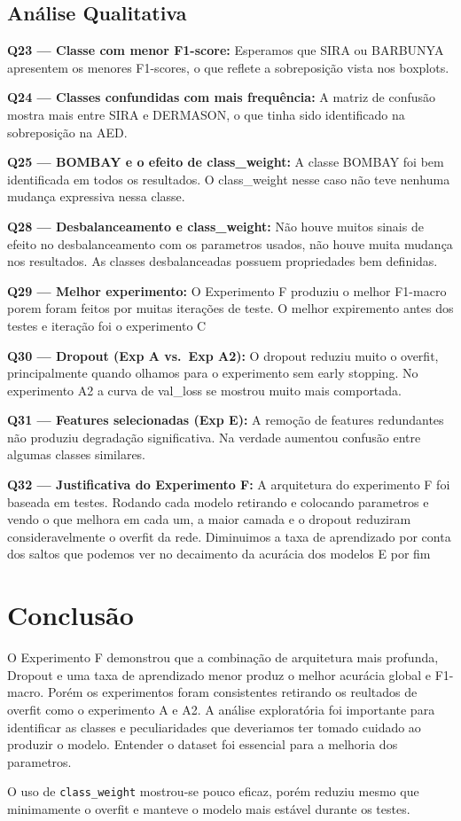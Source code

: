\documentclass[12pt,a4paper]{article}
\begin{document}
\subsection{Análise Qualitativa}

\textbf{Q23 — Classe com menor F1-score:}
Esperamos que SIRA ou BARBUNYA apresentem os menores F1-scores, o que reflete a sobreposição vista nos boxplots.


\textbf{Q24 — Classes confundidas com mais frequência:}
A matriz de confusão mostra mais entre SIRA e DERMASON,
o que tinha sido identificado na
sobreposição na AED.

\textbf{Q25 — BOMBAY e o efeito de class\_weight:}
A classe BOMBAY foi bem identificada em todos os resultados. O class\_weight nesse caso não teve nenhuma mudança expressiva nessa classe.

\textbf{Q28 — Desbalanceamento e class\_weight:}
Não houve muitos sinais de efeito no desbalanceamento com os parametros usados, não houve muita mudança nos resultados. As classes desbalanceadas possuem propriedades bem definidas.

\textbf{Q29 — Melhor experimento:}
O Experimento F produziu o melhor F1-macro porem foram feitos por muitas iterações de teste. O melhor expiremento antes dos testes e iteração foi o experimento C

\textbf{Q30 — Dropout (Exp A vs.\ Exp A2):}
O dropout reduziu muito o overfit, principalmente quando olhamos para o experimento sem early stopping. No experimento A2 a curva de val\_loss se mostrou muito mais comportada.

\textbf{Q31 — Features selecionadas (Exp E):}
A remoção de features redundantes não produziu degradação significativa. Na verdade aumentou confusão entre algumas classes similares.

\textbf{Q32 — Justificativa do Experimento F:}
A arquitetura do experimento F foi baseada em testes. Rodando cada modelo retirando e colocando parametros e vendo o que melhora em cada um, a maior camada e o dropout reduziram consideravelmente o overfit da rede. Diminuimos a taxa de aprendizado por conta dos saltos que podemos ver no decaimento da acurácia dos modelos E por fim 

\section{Conclusão}

O Experimento F demonstrou que a combinação de arquitetura mais profunda,
Dropout e uma taxa de aprendizado menor produz o melhor acurácia global e F1-macro. Porém os experimentos foram consistentes retirando os reultados de overfit como o experimento A e A2.
A análise exploratória foi importante para identificar as classes e peculiaridades que deveriamos ter tomado cuidado ao produzir o modelo. Entender o dataset foi essencial para a melhoria dos parametros.

O uso de \texttt{class\_weight} mostrou-se pouco eficaz, porém reduziu mesmo que minimamente o overfit e manteve o modelo mais estável durante os testes.

\end{document}
